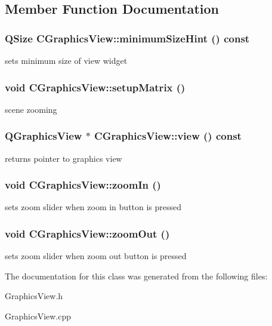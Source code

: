 \subsection{Member Function Documentation}
\hypertarget{classCGraphicsView_a4dc4d8f6b2eb14f0e68c3760b29b0edb}{
\subsubsection[{minimumSizeHint}]{\setlength{\rightskip}{0pt plus 5cm}QSize CGraphicsView::minimumSizeHint () const}}
\label{classCGraphicsView_a4dc4d8f6b2eb14f0e68c3760b29b0edb}
sets minimum size of view widget \hypertarget{classCGraphicsView_a9766abb87c894de2696673d8f4d59b00}{
\subsubsection[{setupMatrix}]{\setlength{\rightskip}{0pt plus 5cm}void CGraphicsView::setupMatrix ()}}
\label{classCGraphicsView_a9766abb87c894de2696673d8f4d59b00}
scene zooming \hypertarget{classCGraphicsView_a2e28f55c94a25ebf465754843469f666}{
\subsubsection[{view}]{\setlength{\rightskip}{0pt plus 5cm}QGraphicsView $\ast$ CGraphicsView::view () const}}
\label{classCGraphicsView_a2e28f55c94a25ebf465754843469f666}
returns pointer to graphics view \hypertarget{classCGraphicsView_a6ab7dc0ecdd75857df6853958de85e20}{
\subsubsection[{zoomIn}]{\setlength{\rightskip}{0pt plus 5cm}void CGraphicsView::zoomIn ()}}
\label{classCGraphicsView_a6ab7dc0ecdd75857df6853958de85e20}
sets zoom slider when zoom in button is pressed \hypertarget{classCGraphicsView_a5f04c98ba128a24812106e080b0f6c44}{
\subsubsection[{zoomOut}]{\setlength{\rightskip}{0pt plus 5cm}void CGraphicsView::zoomOut ()}}
\label{classCGraphicsView_a5f04c98ba128a24812106e080b0f6c44}
sets zoom slider when zoom out button is pressed 

The documentation for this class was generated from the following files:\begin{DoxyCompactItemize}
\item 
GraphicsView.h\item 
GraphicsView.cpp\end{DoxyCompactItemize}
